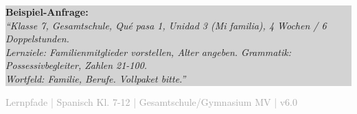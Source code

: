 \documentclass[10pt,a4paper]{article}
\begin{document}
\begin{center}
\end{center}

\vspace{2mm}

\colorbox{lightgray}{\parbox{\textwidth}{
\small\textbf{Beispiel-Anfrage:}\\
\textit{``Klasse 7, Gesamtschule, Qué pasa 1, Unidad 3 (Mi familia), 4 Wochen / 6 Doppelstunden.\\
Lernziele: Familienmitglieder vorstellen, Alter angeben. Grammatik: Possessivbegleiter, Zahlen 21-100.\\
Wortfeld: Familie, Berufe. Vollpaket bitte.''}
}}

\vspace{3mm}

\begin{center}
\textcolor{darkgray}{\footnotesize Lernpfade | Spanisch Kl. 7-12 | Gesamtschule/Gymnasium MV | v6.0}
\end{center}
\end{document}
